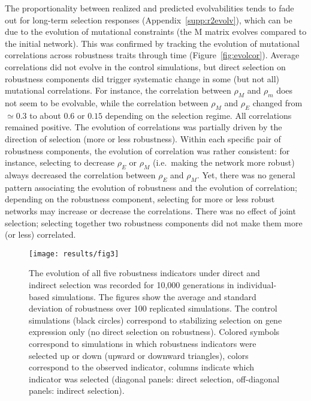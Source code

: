 \documentclass[10pt,a4paper]{article}
\newcommand{\earlyenv}{{\rho_E}}
\newcommand{\earlymut}{{\rho_M}}
\newcommand{\latemut}{{\rho_m}}
\newcommand{\M}{\bm{\mathrm M}}
\newcommand{\SupMat}{Appendix~}
\begin{document}
The proportionality between realized and predicted evolvabilities tends to fade out for long-term selection responses (\SupMat \ref{supp:r2evolv}), which can be due to the evolution of mutational constraints (the $\M$ matrix evolves compared to the initial network). This was confirmed by tracking the evolution of mutational correlations across robustness traits through time (Figure~\ref{fig:evolcor}). Average correlations did not evolve in the control simulations, but direct selection on robustness components did trigger systematic change in some (but not all) mutational correlations. For instance, the correlation between $\earlymut$ and $\latemut$ does not seem to be evolvable, while the correlation between $\earlymut$ and $\earlyenv$ changed from $\simeq 0.3$ to about $0.6$ or $0.15$ depending on the selection regime. All correlations remained positive. The evolution of correlations was partially driven by the direction of selection (more or less robustness). Within each specific pair of robustness components, the evolution of correlation was rather consistent: for instance, selecting to decrease $\earlyenv$ or $\earlymut$ (i.e.\ making the network more robust) always decreased the correlation between $\earlyenv$ and $\earlymut$. Yet, there was no general pattern associating the evolution of robustness and the evolution of correlation; depending on the robustness component, selecting for more or less robust networks may increase or decrease the correlations. There was no effect of joint selection; selecting together two robustness components did not make them more (or less) correlated. 

\begin{figure}[tp!]
\begin{adjustwidth}{-1.5in}{0in}
\begin{flushright}
\texttt{[image: results/fig3]}
\caption{\color{Gray} \label{fig:evol} The evolution of all five robustness indicators under direct and indirect selection was recorded for 10,000 generations in individual-based simulations. The figures show the average and standard deviation of robustness over 100 replicated simulations. The control simulations (black circles) correspond to stabilizing selection on gene expression only (no direct selection on robustness). Colored symbols correspond to simulations in which robustness indicators were selected up or down (upward or downward triangles), colors correspond to the observed indicator, columns indicate which indicator was selected (diagonal panels: direct selection, off-diagonal panels: indirect selection).}
\end{flushright}\end{adjustwidth}
\end{figure}
\end{document}
